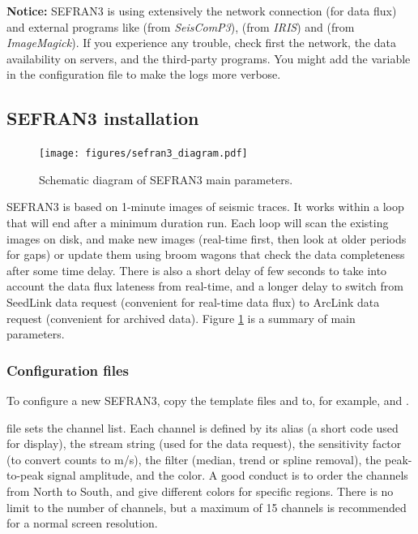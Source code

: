 \textbf{Notice:} SEFRAN3 is using extensively the network connection (for data flux) and external programs like  (from \textit{SeisComP3}),  (from \textit{IRIS}) and  (from \textit{ImageMagick}). If you experience any trouble, check first the network, the data availability on servers, and the third-party programs. You might add the variable  in the configuration file to make the logs more verbose.

\subsection{SEFRAN3 installation}


\begin{figure}
\texttt{[image: figures/sefran3\_diagram.pdf]}
\caption{Schematic diagram of SEFRAN3 main parameters.}
\label{sefran3_diagram}
\end{figure}

SEFRAN3 is based on 1-minute images of seismic traces. It works within a loop that will end after a minimum duration run. Each loop will scan the existing images on disk, and make new images (real-time first, then look at older periods for gaps) or update them using broom wagons that check the data completeness after some time delay. There is also a short delay of few seconds to take into account the data flux lateness from real-time, and a longer delay to switch from SeedLink data request (convenient for real-time data flux) to ArcLink data request (convenient for archived data). Figure \ref{sefran3_diagram} is a summary of main parameters.


\subsubsection{Configuration files}

To configure a new SEFRAN3, copy the template files  and  to, for example,  and .


 file sets the channel list. Each channel is defined by its alias (a short code used for display), the stream string (used for the data request), the sensitivity factor (to convert counts to m/s), the filter (median, trend or spline removal), the peak-to-peak signal amplitude, and the color. A good conduct is to order the channels from North to South, and give different colors for specific regions. There is no limit to the number of channels, but a maximum of 15 channels is recommended for a normal screen resolution.

